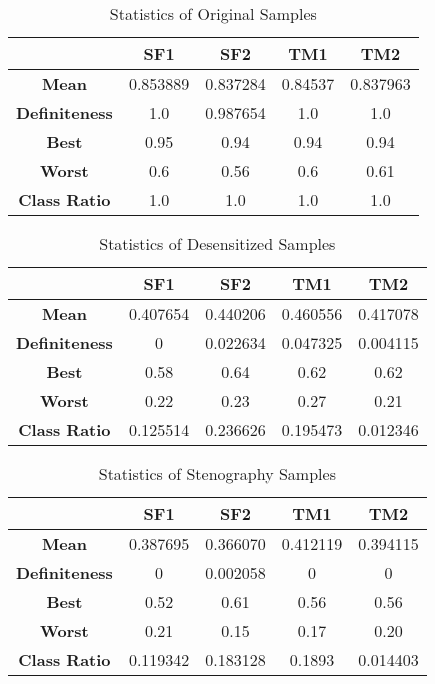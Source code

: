 \documentclass[journal]{IEEEtran} %
\begin{document}
\begin{CJK*}{UTF8}{gbsn}
\begin{table}[htbp]
    \centering
    \caption{Statistics of Original Samples}
    \begin{tabular}{|c|c|c|c|c|}
        \hline
        & \textbf{SF1} & \textbf{SF2} & \textbf{TM1} & \textbf{TM2} \\
        \hline
        \textbf{Mean} & 0.853889 & 0.837284 & 0.84537 & 0.837963 \\
        \hline
        \textbf{Definiteness} & 1.0 & 0.987654 & 1.0 & 1.0 \\
        \hline
        \textbf{Best} & 0.95 & 0.94 & 0.94 & 0.94 \\
        \hline
        \textbf{Worst} & 0.6 & 0.56 & 0.6 & 0.61 \\
        \hline
        \textbf{Class Ratio} & 1.0 & 1.0 & 1.0 & 1.0 \\
        \hline
    \end{tabular}
    \label{tab:st_org}
\end{table}

\begin{table}[htbp]
    \centering
    \caption{Statistics of Desensitized Samples}
    \begin{tabular}{|c|c|c|c|c|}
        \hline
        & \textbf{SF1} & \textbf{SF2} & \textbf{TM1} & \textbf{TM2} \\
        \hline
        \textbf{Mean} & 0.407654 & 0.440206 & 0.460556 & 0.417078 \\
        \hline
        \textbf{Definiteness} & 0 & 0.022634 & 0.047325 & 0.004115 \\
        \hline
        \textbf{Best} & 0.58 & 0.64 & 0.62 & 0.62 \\
        \hline
        \textbf{Worst} & 0.22 & 0.23 & 0.27 & 0.21 \\
        \hline
        \textbf{Class Ratio} & 0.125514 & 0.236626 & 0.195473 & 0.012346 \\
        \hline
    \end{tabular}
    \label{tab:st_des}
\end{table}

\begin{table}[htbp]
    \centering
    \caption{Statistics of Stenography Samples}
    \begin{tabular}{|c|c|c|c|c|}
        \hline
        & \textbf{SF1} & \textbf{SF2} & \textbf{TM1} & \textbf{TM2} \\
        \hline
        \textbf{Mean} & 0.387695 & 0.366070 & 0.412119 & 0.394115 \\
        \hline
        \textbf{Definiteness} & 0 & 0.002058 & 0 & 0 \\
        \hline
        \textbf{Best} & 0.52 & 0.61 & 0.56 & 0.56 \\
        \hline
        \textbf{Worst} & 0.21 & 0.15 & 0.17 & 0.20 \\
        \hline
        \textbf{Class Ratio} & 0.119342 & 0.183128 & 0.1893 & 0.014403 \\
        \hline
    \end{tabular}
    \label{tab:st_msg}
\end{table}


\end{CJK*}
\end{document}
